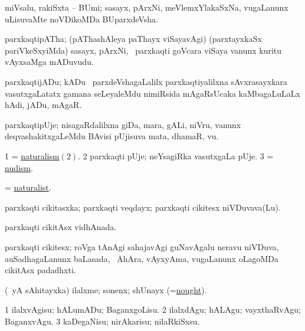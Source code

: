 \bentry
{}
\gl{\nA}
\bmng
miVsalu, rakiSxta -- BUmi; sasayx, pArxNi, meVlemxYlakaSxNa, \mo vugaLanunx uLisuvaMte noVDikoMDa BUparxdeVsha. 
\emng
\eentry

\bentry
{}
\gl{\nA}
\bmng
parxkaqtipATha; (pAThashAleya paThayx viSayavAgi) (parxtayxkaSx pariVkeSxyiMda) sasayx, pArxNi, \mo\ parxkaqti goVcara viSaya \mo vanunx kuritu vAyxsaMga mADuvudu. 
\emng
\eentry

\bentry
{}
\gl{\nA}
\bmng
parxkaqtijADu; kADu \mo\ parxdeVshagaLalilx parxkaqtiyalilxna sAvxrasayxkara vasutxgaLatatx gamana seLeyaleMdu nimiRsida mAgaRsUcaka kaMbagaLuLaLx hAdi, jADu, mAgaR. 
\emng
\eentry

\bentry
{}
\gl{\nA}
\bmng
parxkaqtipUje; nisagaRdalilxna giDa, mara, gALi, niVru, \mo vanunx deqvashakitxgaLeMdu BAvisi pUjisuva mata, dhamaR, \mo vu. 
\emng
\eentry

\bentry
{}
\gl{\nA}
\bmng
\bnum
\num{1} = \hyperlink{naturalism(2)}{naturalism\((2)\)}. 
\num{2} parxkaqti pUje; neYsagiRka vasutxgaLa pUje. 
\num{3} = \hyperlink{nudism}{nudism}. 
\enum
\emng
\eentry

\bentry
{}
\gl{\nA}
\bmng
= \hyperlink{naturalist(1)}{naturalist}. 
\emng
\eentry

\bentry
{}
\gl{\nA}
\bmng
parxkaqti cikitasxka; parxkaqti veqdayx; parxkaqti cikitesx niVDuvava(Lu). 
\emng
\eentry

\bentry
{}
\gl{\gu}
\bmng
parxkaqti cikitAsx vidhAnada. 
\emng
\eentry

\bentry
{}
\gl{\nA}
\bmng
parxkaqti cikitesx; roVga tAnAgi sahajavAgi guNavAgalu neravu niVDuva, auSadhagaLanunx baLasada, \sA\ AhAra, vAyxyAma, \mo vugaLanunx oLagoMDa cikitAsx padadhxti. 
\emng
\eentry

\bentry
{}
\gl{\nA}
\bmng
(\pArxparx\ yA sAhitayxka) ilalxme; sonenx; shUnayx (=\hyperlink{nought}{nought}). 
\emng

\noindent
\gl{\pagu}
\bmng
\bnum
\num{1}  ilalxvAgisu; hALumADu; BaganxgoLisu. 
\num{2}  ilalxdAgu; hALAgu; vayxthaRvAgu; BaganxvAgu. 
\num{3}  kaDegaNisu; nirAkarisu; nilaRkiSxsu. 
\enum
\emng
\eentry


